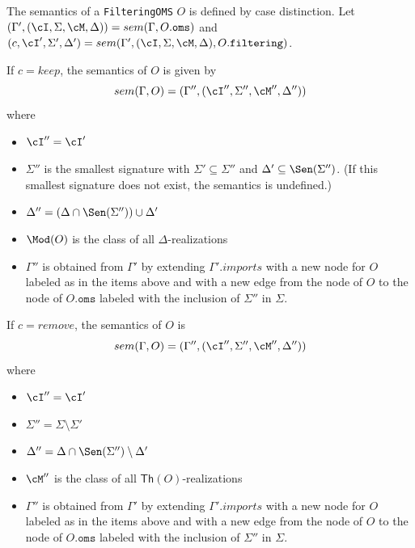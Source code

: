 \documentclass[10pt, a4paper]{isov2}
\newcommand*{\syntax}[1]{\texttt{#1}}
\renewcommand{\Th}{\mathsf{Th}}
\begin{document}
The semantics of a \syntax{FilteringOMS} $O$
is defined by case distinction.
Let
 $(\Gamma',(\cI,\Sigma,\cM, \Delta)) = sem(\Gamma, O.\syntax{oms})$ and
 $(c, \cI',\Sigma',\Delta') = sem(\Gamma', (\cI, \Sigma, \cM, \Delta), O.\syntax{filtering})$.

If $c = keep$,
the semantics of $O$ is given by
$$sem(\Gamma, O) = (\Gamma'',(\cI'',\Sigma'',\cM'',\Delta''))$$
\noindent where
\begin{itemize}
  \item $\cI'' = \cI'$
  \item $\Sigma''$ is the smallest signature
with $\Sigma'\subseteq\Sigma''$ and $\Delta'\subseteq\Sen(\Sigma'')$. ({If this smallest signature does not exist, the semantics is undefined.})
  \item $\Delta'' = (\Delta\cap\Sen(\Sigma''))\cup\Delta'$
  \item $\Mod(O)$ is the class of all $\Delta$-realizations
  \item $\Gamma''$ is obtained from
       $\Gamma'$
       by extending $\Gamma'.imports$
       with a new node for $O$ labeled as in the items above and
       with a new edge from the node of $O$ to the node of $O.\syntax{oms}$
        labeled with the inclusion of $\Sigma''$ in $\Sigma$.
\end{itemize}

\noindent
If $c = remove$, the semantics of $O$
is
$$sem(\Gamma, O) = (\Gamma'',(\cI'',\Sigma'',\cM'',\Delta''))$$
\noindent where
\begin{itemize}
  \item $\cI'' = \cI'$
  \item $\Sigma'' = \Sigma\setminus \Sigma'$
  \item $\Delta'' = \Delta\cap\Sen(\Sigma'')\setminus\Delta'$
  \item $\cM''$ is the class of all $\Th(O)$-realizations
    \item $\Gamma''$ is obtained from
       $\Gamma'$
       by extending $\Gamma'.imports$
       with a new node for $O$ labeled as in the items above and
       with a new edge from the node of $O$ to the node of $O.\syntax{oms}$
        labeled with the inclusion of $\Sigma''$ in $\Sigma$.
\end{itemize}

\end{document}

